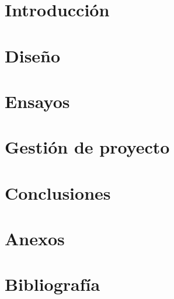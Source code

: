 \documentclass[12pt,oneside,final]{rf2}
\begin{document}





\newpage
{}

\tableofcontents

\listoffigures

\listoftables
\newpage



\startarabicpagination
\part{Introducción}


\part{Diseño}


%


\part{Ensayos}


\part{Gestión de proyecto}



\part{Conclusiones}


\part{Anexos}
\appendix






\part{Bibliografía}


\end{document}
